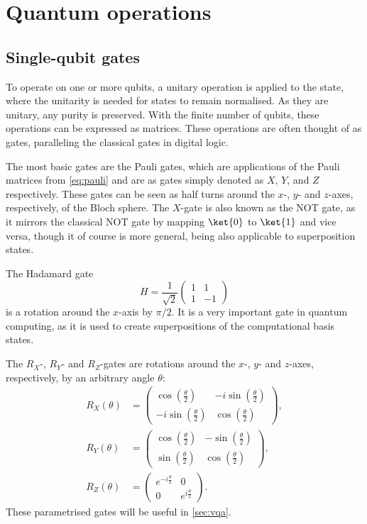 \section{Quantum operations}
\label{sec:quantum_operations}
\subsection{Single-qubit gates}
To operate on one or more qubits, a unitary operation is applied to the state, where the unitarity is needed for states to remain normalised.
As they are unitary, any purity is preserved.
With the finite number of qubits, these operations can be expressed as matrices.
These operations are often thought of as gates, paralleling the classical gates in digital logic.


The most basic gates are the Pauli gates, which are applications of the Pauli matrices from \cref{eq:pauli} and are as gates simply denoted as $X$, $Y$, and $Z$ respectively.
These gates can be seen as half turns around the $x$-, $y$- and $z$-axes, respectively, of the Bloch sphere.
The $X$-gate is also known as the NOT gate, as it mirrors the classical NOT gate by mapping $\ket{0}$ to $\ket{1}$ and vice versa, though it of course is more general, being also applicable to superposition states.

The Hadamard gate
\begin{equation}
    H = \frac{1}{\sqrt{2}} \begin{pmatrix} 1 & 1 \\ 1 & -1 \end{pmatrix}
\end{equation}
is a rotation around the $x$-axis by $\pi/2$.
It is a very important gate in quantum computing, as it is used to create superpositions of the computational basis states.


The $R_X$-, $R_Y$- and $R_Z$-gates are rotations around the $x$-, $y$- and $z$-axes, respectively, by an arbitrary angle $\theta$:
\begin{align*}
    R_X(\theta) & = \begin{pmatrix} \cos\left(\frac{\theta}{2}\right) & -i \sin\left(\frac{\theta}{2}\right) \\ -i \sin\left(\frac{\theta}{2}\right) & \cos\left(\frac{\theta}{2}\right) \end{pmatrix}, \\
    R_Y(\theta) & = \begin{pmatrix} \cos\left(\frac{\theta}{2}\right) & -\sin\left(\frac{\theta}{2}\right) \\ \sin\left(\frac{\theta}{2}\right) & \cos\left(\frac{\theta}{2}\right) \end{pmatrix},      \\
    R_Z(\theta) & = \begin{pmatrix} e^{-i\frac{\theta}{2}} & 0 \\ 0 & e^{i\frac{\theta}{2}} \end{pmatrix}.
\end{align*}
These parametrised gates will be useful in \cref{sec:vqa}.

